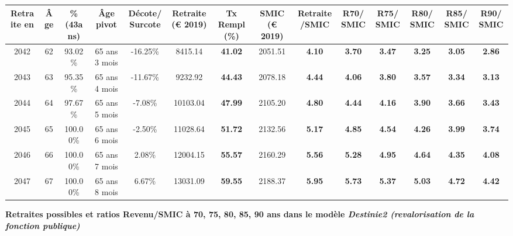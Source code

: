 \begin{adjustbox}{max width=\textwidth} 
\begin{tabular}[htb]{|c|c||c|c|c||c|c||c|c||c|c|c|c|c|} 
\hline 
 Retraite en &  Âge &  \%(43ans) &  Âge pivot &  Décote/Surcote &  Retraite (\euro{} 2019) &  Tx Rempl(\%) &  SMIC (\euro{} 2019) &  Retraite/SMIC &  R70/SMIC &  R75/SMIC &  R80/SMIC &  R85/SMIC &  R90/SMIC \\ 
\hline \hline 
 2042 &  62 &  93.02\% &  65 ans 3 mois &  -16.25\% &  8415.14 &  {\bf 41.02} &  2051.51 &  {\bf 4.10} &  {\bf 3.70} &  {\bf 3.47} &  {\bf 3.25} &  {\bf 3.05} &  {\bf 2.86} \\ 
\hline 
 2043 &  63 &  95.35\% &  65 ans 4 mois &  -11.67\% &  9232.92 &  {\bf 44.43} &  2078.18 &  {\bf 4.44} &  {\bf 4.06} &  {\bf 3.80} &  {\bf 3.57} &  {\bf 3.34} &  {\bf 3.13} \\ 
\hline 
 2044 &  64 &  97.67\% &  65 ans 5 mois &  -7.08\% &  10103.04 &  {\bf 47.99} &  2105.20 &  {\bf 4.80} &  {\bf 4.44} &  {\bf 4.16} &  {\bf 3.90} &  {\bf 3.66} &  {\bf 3.43} \\ 
\hline 
 2045 &  65 &  100.00\% &  65 ans 6 mois &  -2.50\% &  11028.64 &  {\bf 51.72} &  2132.56 &  {\bf 5.17} &  {\bf 4.85} &  {\bf 4.54} &  {\bf 4.26} &  {\bf 3.99} &  {\bf 3.74} \\ 
\hline 
 2046 &  66 &  100.00\% &  65 ans 7 mois &  2.08\% &  12004.15 &  {\bf 55.57} &  2160.29 &  {\bf 5.56} &  {\bf 5.28} &  {\bf 4.95} &  {\bf 4.64} &  {\bf 4.35} &  {\bf 4.08} \\ 
\hline 
 2047 &  67 &  100.00\% &  65 ans 8 mois &  6.67\% &  13031.09 &  {\bf 59.55} &  2188.37 &  {\bf 5.95} &  {\bf 5.73} &  {\bf 5.37} &  {\bf 5.03} &  {\bf 4.72} &  {\bf 4.42} \\ 
\hline 
\hline 
\end{tabular} 
\end{adjustbox} 
 
 \vspace{0.1cm} 
{\bf \noindent Retraites possibles et ratios Revenu/SMIC à 70, 75, 80, 85, 90 ans dans le modèle \emph{Destinie2 (revalorisation de la fonction publique)}}  
 
